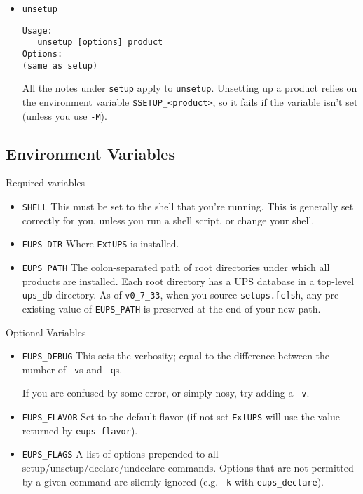 \documentclass{article}
\newcommand{\code}[1]{\texttt{#1}}
\newcommand{\eups}{\code{ExtUPS}}
\begin{document}
\begin{itemize}
If \eups{} detects an error, the file-to-source will be empty (i.e.
the setup will be aborted) unless you specify \code{--force}.


\item \code{unsetup}
\begin{verbatim}
Usage:
   unsetup [options] product
Options:
(same as setup)
\end{verbatim}
  
All the notes under \code{setup} apply to
\code{unsetup}. Unsetting up a product relies on the environment
variable \code{\$SETUP\_<product>}, so it fails if the variable
isn't set (unless you use \code{-M}).

\end{itemize}

\subsection{Environment Variables}

Required variables -

\begin{itemize}
  \item \code{SHELL}
    This must be set to the shell that you're running. This is
    generally set correctly for you, unless you run a shell script, or
    change your shell.

  \item \code{EUPS\_DIR}
    Where \eups{} is installed.

  \item \code{EUPS\_PATH}
    The colon-separated path of root directories under which all products are installed.
    Each root directory has a UPS database in a top-level \code{ups\_db} directory.
    As of \code{v0\_7\_33}, when you source \code{setups.[c]sh}, any
    pre-existing value of \code{EUPS\_PATH} is preserved at the end of
    your new path.
\end{itemize}

Optional Variables -

\begin{itemize}
  \item \code{EUPS\_DEBUG}
    This sets the verbosity; equal to the difference between the number of \code{-v}s
    and \code{-q}s.

    If you are confused by some error, or simply nosy, try adding a \code{-v}.

  \item \code{EUPS\_FLAVOR}
    Set to the default flavor (if not set \eups{} will use the value returned
    by \code{eups flavor}).

  \item \code{EUPS\_FLAGS}
    A list of options prepended to all setup/unsetup/declare/undeclare commands. Options
    that are not permitted by a given command are silently ignored (e.g. \code{-k}
    with \code{eups\_declare}).
\end{itemize}
\end{document}
